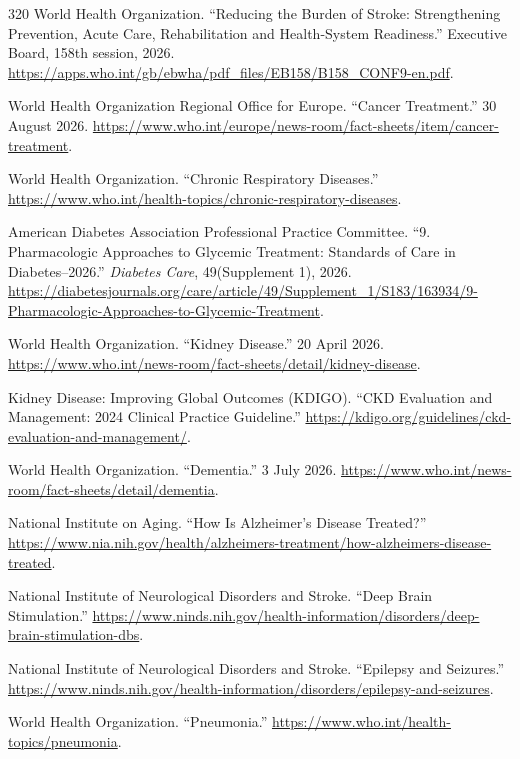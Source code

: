 \documentclass[12pt,oneside]{book}
\begin{document}
\begin{thebibliography}{320}
World Health Organization. ``Reducing the Burden of Stroke: Strengthening
Prevention, Acute Care, Rehabilitation and Health-System Readiness.'' Executive
Board, 158th session, 2026.
\url{https://apps.who.int/gb/ebwha/pdf_files/EB158/B158_CONF9-en.pdf}.

World Health Organization Regional Office for Europe. ``Cancer Treatment.''
30 August 2026.
\url{https://www.who.int/europe/news-room/fact-sheets/item/cancer-treatment}.

World Health Organization. ``Chronic Respiratory Diseases.''
\url{https://www.who.int/health-topics/chronic-respiratory-diseases}.

American Diabetes Association Professional Practice Committee. ``9.
Pharmacologic Approaches to Glycemic Treatment: Standards of Care in
Diabetes--2026.'' \emph{Diabetes Care}, 49(Supplement 1), 2026.
\url{https://diabetesjournals.org/care/article/49/Supplement_1/S183/163934/9-Pharmacologic-Approaches-to-Glycemic-Treatment}.

World Health Organization. ``Kidney Disease.'' 20 April 2026.
\url{https://www.who.int/news-room/fact-sheets/detail/kidney-disease}.

Kidney Disease: Improving Global Outcomes (KDIGO). ``CKD Evaluation and
Management: 2024 Clinical Practice Guideline.''
\url{https://kdigo.org/guidelines/ckd-evaluation-and-management/}.

World Health Organization. ``Dementia.'' 3 July 2026.
\url{https://www.who.int/news-room/fact-sheets/detail/dementia}.

National Institute on Aging. ``How Is Alzheimer's Disease Treated?''
\url{https://www.nia.nih.gov/health/alzheimers-treatment/how-alzheimers-disease-treated}.

National Institute of Neurological Disorders and Stroke. ``Deep Brain
Stimulation.''
\url{https://www.ninds.nih.gov/health-information/disorders/deep-brain-stimulation-dbs}.

National Institute of Neurological Disorders and Stroke. ``Epilepsy and
Seizures.''
\url{https://www.ninds.nih.gov/health-information/disorders/epilepsy-and-seizures}.

World Health Organization. ``Pneumonia.''
\url{https://www.who.int/health-topics/pneumonia}.


\end{thebibliography}
\end{document}
